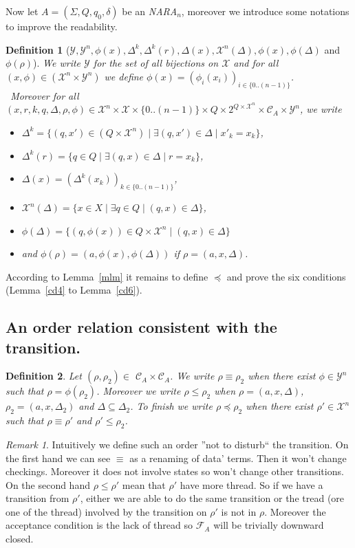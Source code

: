 \documentclass[a4paper,10pt]{report}
\newtheorem{df}{Definition}
\theoremstyle{remark}
\newtheorem{rk}{Remark}
\newcommand{\seg}[1]{\{#1\}}
\newcommand{\ts}{\seg{0 .. (n-1)}}
\newcommand{\C}{\mathcal{C}_{A}}
\newcommand{\F}{\mathcal{F}_{A}}
\newcommand{\Xa}{\mathcal{X}}
\newcommand{\X}{\mathcal{X}^{n}}
\newcommand{\Ya}{\mathcal{Y}}
\newcommand{\Y}{\mathcal{Y}^{n}}
\begin{document}
Now let $A =(\Sigma ,Q ,q_0, \delta )$ be an \textit{NARA}$_n$, moreover we introduce some notations to improve the readability.

\begin{df}[$\Ya, \Y, \phi(x),\Delta^k,\Delta^k(r),\Delta(x), \X(\Delta),\phi(x), \phi(\Delta)$ and $ \phi(\rho)$]
We write $\Ya$ for the set of all bijections on $\Xa$  and
for all $(x,\phi) \in (\X \times \Y)$ we define $\phi(x) = (\phi_i(x_i))_{i \in \ts} $. \\\  
Moreover for all $(x,r,k,q,\Delta,\rho,\phi) \in \X \times \Xa \times \ts \times Q \times 2^{Q \times \X} \times \C \times \Y$, we write 
\begin{itemize}
\item $\Delta^k = \{(q,x') \in (Q \times \X) \mid \exists  (q,x') \in \Delta \mid x'_k = x_k\}$,
\item $\Delta^k(r) = \{q \in Q \mid \exists  (q,x) \in \Delta \mid r = x_k\}$,
\item $\Delta(x) = {(\Delta^k(x_k))}_{k \in \ts}$,
\item $\X(\Delta) = \{ x\in X \mid \exists q\in Q \mid (q,x) \in \Delta \}$,
\item $\phi(\Delta) = \{ (q,\phi(x)) \in Q \times \X \mid (q,x) \in \Delta \}$ 
\item and $\phi(\rho) = (a,\phi(x),\phi(\Delta))$ if $\rho = (a,x,\Delta)$.
\end{itemize}
\end{df}


According to Lemma~\ref{mlm} it remains to define $\preceq$ and prove the six conditions (Lemma~\ref{cd4} to Lemma~\ref{cd6}).

\subsection{An order relation consistent with the transition.}
\begin{df}
  Let $(\rho,\rho_2) \in$  $\C\times\C$.
  We write $\rho \equiv \rho_2$ when there exist $\phi \in \Y$ such that  $ \rho = \phi(\rho_2)$.    
  Moreover we write $\rho \leq \rho_2$ when $ \rho=(a ,x, \Delta  )$, $\rho_2=(a ,x, \Delta_2  )$ and $\Delta \subseteq \Delta_2$.
  To finish we write $\rho \preceq \rho_2$ when there exist $\rho' \in \X$ such that $\rho \equiv \rho'$ and $\rho' \leq \rho_2$.
\end{df}



\begin{rk}
  Intuitively we define such an order ''not to disturb`` the transition.
  On the first hand we can see $\equiv$ as a renaming of data' terms. Then it won't change checkings. Moreover it does not involve states so won't change other transitions. 
  On the second hand $\rho \leq \rho'$ mean that $\rho'$ have more thread. So if we have a transition from $\rho'$, either we are able to do the same transition 
  or the tread (ore one of the thread) involved by the transition on $\rho'$ is not in $\rho$. 
  Moreover the acceptance condition is the lack of thread so $\F$ will be trivially downward closed. 
\end{rk}
\end{document}
